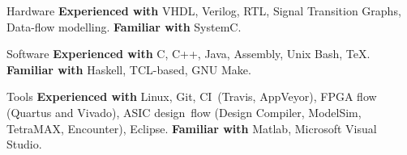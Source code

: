 
\begin{cvskills}

\cvskill
{Hardware}
{\textbf{Experienced with} VHDL, Verilog, RTL, Signal Transition Graphs, 
Data-flow modelling. \textbf{Familiar with} SystemC.}

\cvskill
{Software}
{\textbf{Experienced with} C, C++, Java, Assembly, Unix Bash, TeX. 
\textbf{Familiar with} Haskell, TCL-based, GNU Make.}

\cvskill
{Tools}
{\textbf{Experienced with} Linux, Git, CI~(Travis, AppVeyor), FPGA 
flow (Quartus and Vivado), ASIC design~flow (Design Compiler, ModelSim, 
TetraMAX, Encounter), Eclipse. \textbf{Familiar with} Matlab, 
Microsoft Visual 
Studio.}

\end{cvskills}

